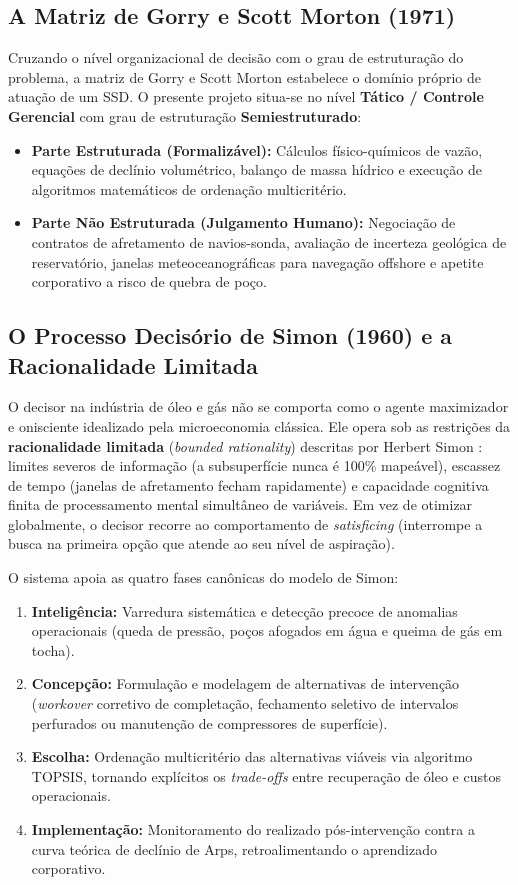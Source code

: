 \documentclass[12pt,a4paper]{article}
\begin{document}
\subsection{A Matriz de Gorry e Scott Morton (1971)}
Cruzando o nível organizacional de decisão com o grau de estruturação do problema, a matriz de Gorry e Scott Morton \cite{gorry1971} estabelece o domínio próprio de atuação de um SSD. O presente projeto situa-se no nível \textbf{Tático / Controle Gerencial} com grau de estruturação \textbf{Semiestruturado}:
\begin{itemize}[leftmargin=*]
    \item \textbf{Parte Estruturada (Formalizável):} Cálculos físico-químicos de vazão, equações de declínio volumétrico, balanço de massa hídrico e execução de algoritmos matemáticos de ordenação multicritério.
    \item \textbf{Parte Não Estruturada (Julgamento Humano):} Negociação de contratos de afretamento de navios-sonda, avaliação de incerteza geológica de reservatório, janelas meteoceanográficas para navegação offshore e apetite corporativo a risco de quebra de poço.
\end{itemize}

\subsection{O Processo Decisório de Simon (1960) e a Racionalidade Limitada}
O decisor na indústria de óleo e gás não se comporta como o agente maximizador e onisciente idealizado pela microeconomia clássica. Ele opera sob as restrições da \textbf{racionalidade limitada} (\textit{bounded rationality}) descritas por Herbert Simon \cite{simon1960}: limites severos de informação (a subsuperfície nunca é 100\% mapeável), escassez de tempo (janelas de afretamento fecham rapidamente) e capacidade cognitiva finita de processamento mental simultâneo de variáveis. Em vez de otimizar globalmente, o decisor recorre ao comportamento de \textit{satisficing} (interrompe a busca na primeira opção que atende ao seu nível de aspiração).

O sistema apoia as quatro fases canônicas do modelo de Simon:
\begin{enumerate}
    \item \textbf{Inteligência:} Varredura sistemática e detecção precoce de anomalias operacionais (queda de pressão, poços afogados em água e queima de gás em tocha).
    \item \textbf{Concepção:} Formulação e modelagem de alternativas de intervenção (\textit{workover} corretivo de completação, fechamento seletivo de intervalos perfurados ou manutenção de compressores de superfície).
    \item \textbf{Escolha:} Ordenação multicritério das alternativas viáveis via algoritmo TOPSIS, tornando explícitos os \textit{trade-offs} entre recuperação de óleo e custos operacionais.
    \item \textbf{Implementação:} Monitoramento do realizado pós-intervenção contra a curva teórica de declínio de Arps, retroalimentando o aprendizado corporativo.
\end{enumerate}
\end{document}
